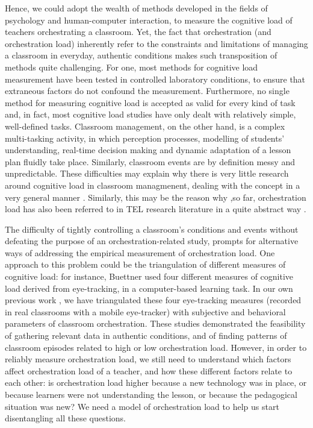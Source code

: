 \documentclass[10pt,journal,compsoc]{IEEEtran}
\begin{document}
Hence, we could adopt the wealth of methods developed in the fields of psychology and human-computer interaction, to measure the cognitive load of teachers orchestrating a classroom. Yet, the fact that orchestration (and orchestration load) inherently refer to the constraints and limitations of managing a classroom in everyday, authentic conditions \cite{Roschelle2013} makes such transposition of methods quite challenging. For one, most methods for cognitive load measurement have been tested in controlled laboratory conditions, to ensure that extraneous factors do not confound the measurement. Furthermore, no single method for measuring cognitive load is accepted as valid for every kind of task \cite{boucsein2000engineering} and, in fact, most cognitive load studies have only dealt with relatively simple, well-defined tasks. Classroom management, on the other hand, is a complex multi-tasking activity, in which perception processes, modelling of students' understanding, real-time decision making and dynamic adaptation of a lesson plan fluidly take place. Similarly, classroom events are by definition messy and unpredictable. These difficulties may explain why there is very little research around cognitive load in classroom managmenent, dealing with the concept in a very general manner \cite{feldon2007cognitive}. Similarly, this may be the reason why ,so far, orchestration load has also been referred to in TEL research literature in a quite abstract way \cite{Cuendet2013, munoz2013sharing}.

The difficulty of tightly controlling a classroom's conditions and events without defeating the purpose of an orchestration-related study, prompts for alternative ways of addressing the empirical measurement of orchestration load. One approach to this problem could be the triangulation of different measures of cognitive load: for instance, Buettner \cite{Buettner2013} used four different measures of cognitive load derived from eye-tracking, in a computer-based learning task. In our own previous work \cite{Prieto2015ectel}, we have triangulated these four eye-tracking measures (recorded in real classrooms with a mobile eye-tracker) with subjective and behavioral parameters of classroom orchestration. These studies demonstrated the feasibility of gathering relevant data in authentic conditions, and of finding patterns of classroom episodes related to high or low orchestration load. However, in order to reliably measure orchestration load, we still need to understand which factors affect orchestration load of a teacher, and how these different factors relate to each other: is orchestration load higher because a new technology was in place, or because learners were not understanding the lesson, or because the pedagogical situation was new? We need a model of orchestration load to help us start disentangling all these questions.
\end{document}
